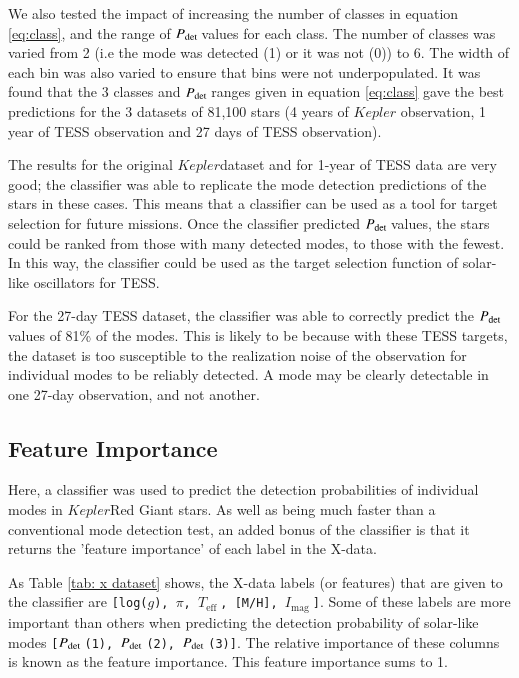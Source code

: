 \documentclass[a4paper,fleqn,usenatbib,useAMS]{mnras}
\newcommand{\teff}{\ensuremath{T_{\textrm{eff}}\:}}
\newcommand{\kep}{\ensuremath{Kepler}\:}
\newcommand{\pdet}{\ensuremath{P_{\rm det}\:}}
\newcommand{\imag}{\ensuremath{I_{\textrm{mag}}\:}}
\begin{document}
We also tested the impact of increasing the number of classes in equation \ref{eq:class}, and the range of \pdet values for each class. The number of classes was varied from 2 (i.e the mode was detected (1) or it was not (0)) to 6. The width of each bin was also varied to ensure that bins were not underpopulated. It was found that the 3 classes and \pdet ranges given in equation \ref{eq:class} gave the best predictions for the 3 datasets of 81,100 stars (4 years of $Kepler$ observation, 1 year of TESS observation and 27 days of TESS observation). 

The results for the original \kep dataset and for 1-year of TESS data are very good; the classifier was able to replicate the mode detection predictions of the stars in these cases. This means that a classifier can be used as a tool for target selection for future missions. Once the classifier predicted \pdet values, the stars could be ranked from those with many detected modes, to those with the fewest. In this way, the classifier could be used as the target selection function of solar-like oscillators for TESS. 

For the 27-day TESS dataset, the classifier was able to correctly predict the \pdet values of 81\% of the modes. This is likely to be because with these TESS targets, the dataset is too susceptible to the realization noise of the observation for individual modes to be reliably detected. A mode may be clearly detectable in one 27-day observation, and not another.


\subsection{Feature Importance}
\label{sect: feature importance}

Here, a classifier was used to predict the detection probabilities of individual modes in \kep Red Giant stars. As well as being much faster than a conventional mode detection test, an added bonus of the classifier is that it returns the 'feature importance' of each label in the X-data.

As Table \ref{tab: x dataset} shows, the X-data labels (or features) that are given to the classifier are \texttt{[log($g$), $\pi$, \teff, [M/H], \imag]}. Some of these labels are more important than others when predicting the detection probability of solar-like modes \texttt{[\pdet(1), \pdet(2), \pdet(3)]}. The relative importance of these columns is known as the feature importance. This feature importance sums to 1.
\end{document}
